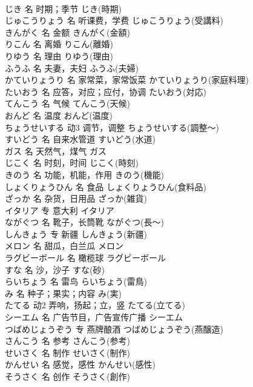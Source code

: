\documentclass[8pt]{extreport}
\begin{document}
\begin{CJK}{UTF8}{min}
\\	じき	名	时期；季节	じき(時期)	
\\	じゅこうりょう	名	听课费，学费	じゅこうりょう(受講料)	
\\	きんがく	名	金额	きんがく(金額)	
\\	りこん	名	离婚	りこん(離婚)	
\\	りゆう	名	理由	りゆう(理由)	
\\	ふうふ	名	夫妻，夫妇	ふうふ(夫婦)	
\\	かていりょうり	名	家常菜，家常饭菜	かていりょうり(家庭料理)	
\\	たいおう	名	应答，对应；应付，协调	たいおう(対応)	
\\	てんこう	名	气候	てんこう(天候)	
\\	おんど	名	温度	おんど(温度)	
\\	ちょうせいする	动3	调节，调整	ちょうせいする(調整～)	
\\	すいどう	名	自来水管道	すいどう(水道)	
\\	ガス	名	天然气，煤气	ガス	
\\	じこく	名	时刻，时间	じこく(時刻)	
\\	きのう	名	功能，机能，作用	きのう(機能)	
\\	しょくりょうひん	名	食品	しょくりょうひん(食料品)	
\\	ざっか	名	杂货，日用品	ざっか(雑貨)	
\\	イタリア	专	意大利	イタリア	
\\	ながぐつ	名	靴子，长筒靴	ながぐつ(長～)	
\\	しんきょう	专	新疆	しんきょう(新疆)	
\\	メロン	名	甜瓜，白兰瓜	メロン	
\\	ラグビーボール	名	橄榄球	ラグビーボール	
\\	すな	名	沙，沙子	すな(砂)	
\\	らいちょう	名	雷鸟	らいちょう(雷鳥)	
\\	み	名	种子；果实；内容	み(実)	
\\	たてる	动2	弄响，扬起；立，竖	たてる(立てる)	
\\	シーエム	名	广告节目，广告宣传广播	シーエム
\\	つばめじょうぞう	专	燕牌酿酒	つばめじょうぞう(燕醸造)	
\\	さんこう	名	参考	さんこう(参考)	
\\	せいさく	名	制作	せいさく(制作)	
\\	かんせい	名	感觉，感性	かんせい(感性)	
\\	そうさく	名	创作	そうさく(創作)	

\end{CJK}
\end{document}
